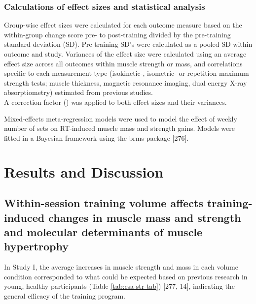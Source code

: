 \documentclass[twoside,10pt]{gihclass} %
\begin{document}
\hypertarget{calculations-of-effect-sizes-and-statistical-analysis}{%
\subsection{Calculations of effect sizes and statistical analysis}\label{calculations-of-effect-sizes-and-statistical-analysis}}

Group-wise effect sizes were calculated for each outcome measure based
on the within-group change score pre- to post-training divided by the
pre-training standard deviation (SD). Pre-training SD's were calculated
as a pooled SD within outcome and study. Variances of the effect size
were calculated using an average effect size across all outcomes within
muscle strength or mass, and correlations specific to each measurement
type (isokinetic-, isometric- or repetition maximum strength tests;
muscle thickness, magnetic resonance imaging, dual energy X‐ray
absorptiometry) estimated from previous studies.\\
A correction factor () was applied to both effect sizes and their
variances.

Mixed-effects meta-regression models were used to model the effect of
weekly number of sets on RT-induced muscle mass and strength gains.
Models were fitted in a Bayesian framework using the brms-package
{[}276{]}.

\hypertarget{results-and-discussion}{%
\chapter{Results and Discussion}\label{results-and-discussion}}

\hypertarget{muscle-mass-growth}{%
\section{Within-session training volume affects training-induced changes in muscle mass and strength and molecular determinants of muscle hypertrophy}\label{muscle-mass-growth}}

In Study I, the average increases in muscle strength and mass in each volume condition corresponded to what could be expected based on previous research in young, healthy participants (Table \ref{tab:csa-str-tab})
{[}277, 14{]},
indicating the general efficacy of the training program.
\end{document}
